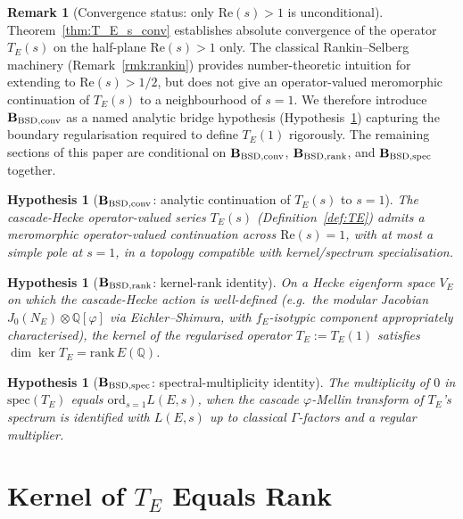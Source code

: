 \documentclass[11pt, a4paper]{amsart}
\newtheorem{hypothesis}[theorem]{Hypothesis}
\theoremstyle{definition}
\newtheorem{remark}[theorem]{Remark}
\newcommand{\Q}{\mathbb{Q}}
\newcommand{\pphi}{\varphi}
\begin{document}
\begin{remark}[Convergence status: only $\mathrm{Re}(s) > 1$ is unconditional]
\label{rmk:BSD_conv_status}
Theorem~\ref{thm:T_E_s_conv} establishes absolute convergence of
the operator $T_E(s)$ on the half-plane $\mathrm{Re}(s) > 1$ only.
The classical Rankin--Selberg machinery
(Remark~\ref{rmk:rankin}) provides number-theoretic intuition for
extending to $\mathrm{Re}(s) > 1/2$, but does not give an
operator-valued meromorphic continuation of $T_E(s)$ to a
neighbourhood of $s=1$. We therefore introduce
$\mathbf{B_{\rm BSD,conv}}$ as a named analytic bridge hypothesis
(Hypothesis~\ref{hyp:BSD_conv}) capturing the boundary regularisation
required to define $T_E(1)$ rigorously. The remaining sections of
this paper are conditional on $\mathbf{B_{\rm BSD,conv}}$,
$\mathbf{B_{\rm BSD,rank}}$, and $\mathbf{B_{\rm BSD,spec}}$
together.
\end{remark}

\begin{hypothesis}[$\mathbf{B_{\rm BSD,conv}}$: analytic continuation of $T_E(s)$ to $s=1$]\label{hyp:BSD_conv}
The cascade-Hecke operator-valued series $T_E(s)$
(Definition~\ref{def:TE}) admits a meromorphic operator-valued
continuation across $\mathrm{Re}(s) = 1$, with at most a simple
pole at $s = 1$, in a topology compatible with kernel/spectrum
specialisation.
\end{hypothesis}

\begin{hypothesis}[$\mathbf{B_{\rm BSD,rank}}$: kernel-rank identity]\label{hyp:BSD_rank}
On a Hecke eigenform space $V_E$ on which the cascade-Hecke action
is well-defined (e.g.\ the modular Jacobian
$J_0(N_E)\otimes \Q[\pphi]$ via Eichler--Shimura, with
$f_E$-isotypic component appropriately characterised), the kernel
of the regularised operator $T_E := T_E(1)$ satisfies
$\dim\ker T_E = \mathrm{rank}\, E(\Q)$.
\end{hypothesis}

\begin{hypothesis}[$\mathbf{B_{\rm BSD,spec}}$: spectral-multiplicity identity]\label{hyp:BSD_spec}
The multiplicity of $0$ in $\mathrm{spec}(T_E)$ equals
$\mathrm{ord}_{s=1} L(E,s)$, when the cascade $\pphi$-Mellin
transform of $T_E$'s spectrum is identified with $L(E,s)$ up to
classical $\Gamma$-factors and a regular multiplier.
\end{hypothesis}

\section{Kernel of $T_E$ Equals Rank}
\end{document}
